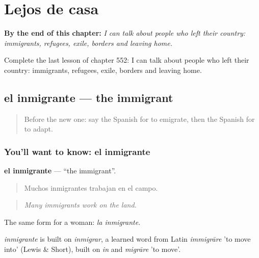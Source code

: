 
\chapter{Lejos de casa}
\label{ch:es-lejos-de-casa}

\begin{chapteropening}
\textbf{By the end of this chapter:} \emph{I can talk about people who left their country: immigrants, refugees, exile, borders and leaving home.}

Complete the last lesson of chapter 552: I can talk about people who left their country: immigrants, refugees, exile, borders and leaving home.
\end{chapteropening}

\section[el inmigrante]{el inmigrante — the immigrant}

\label{lesson:ES-C552-inmigrante}



\begin{quote}
Before the new one: say the Spanish for to emigrate, then the Spanish for to adapt.
\end{quote}

\subsection*{You'll want to know: el inmigrante}
\textbf{el inmigrante} — \textquotedblleft{}the immigrant\textquotedblright{}.

\begin{quote}
Muchos inmigrantes trabajan en el campo.
\end{quote}

\begin{quote}
\emph{Many immigrants work on the land.}
\end{quote}

The same form for a woman: \emph{la inmigrante}.

\begin{cousinweb}
\emph{inmigrante} is built on \emph{inmigrar}, a learned word from Latin \emph{immigrāre} 'to move into' (Lewis \& Short), built on \emph{in} and \emph{migrāre} 'to move'.
\end{cousinweb}

